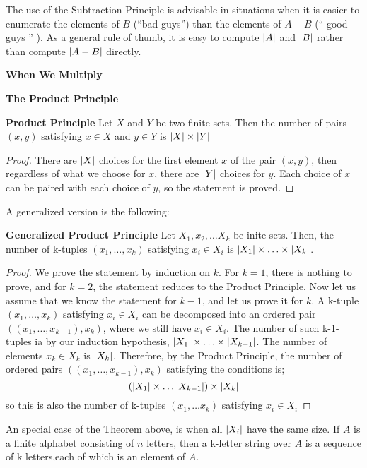 The use of the Subtraction Principle is advisable in situations when it is easier to enumerate the elements of $B$ (``bad guys'') than the elements of $ A - B $ (`` good guys '' ). As a general rule of thumb, it is easy to compute $\left| A \right|$ and $\left| B \right|$ rather than compute $ \left| A - B \right| $ directly.

\textbf{When We Multiply}

\textbf{The Product Principle}

\begin{thm}
	\textbf{Product Principle} Let $X$ and $Y$ be two finite sets. Then the number of pairs $(x,y)$ satisfying $x \in X $ and $y \in Y$ is $\left| X \right| \times \left| Y \right|$
\end{thm}
\begin{proof}
	There are $\left| X \right| $ choices for the first element $x$ of the pair $(x,y)$, then regardless of what we choose for $x$, there are $\left| Y \right|$ choices for $y$. Each choice of $x$ can be paired with each choice of $y$, so the statement is proved.
\end{proof}

A generalized version is the following:

\begin{thm}
	\textbf{Generalized Product Principle} Let $X_1,x_2, \ldots X_k$ be inite sets. Then, the number of k-tuples $(x_1,\ldots,x_k) $ satisfying $x_i \in X_i$ is $ \left| X_1 \right| \times \ldots \times \left| X_k \right| $.
\end{thm}

\begin{proof}
	We prove the statement by induction on $k$. For $k = 1$, there is nothing to prove, and for $ k = 2$, the statement reduces to the Product Principle. Now let us assume that we know the statement for $ k-1$, and let us prove it for $k$. A k-tuple $ (x_1, \ldots, x_k) $ satisfying $x_i \in X_i$ can be decomposed into an ordered pair $ ((x_1, \ldots, x_{k-1}), x_k) $, where we still have $x_i \in X_i$. The number of such k-1-tuples ia by our induction hypothesis, $ \left| X_1 \right| \times \ldots \times \left| X_{k-1} \right| $. The number of elements $x_k \in X_k$ is $ \left| X_k \right| $. Therefore, by the Product Principle, the number of ordered pairs $ ((x_1, \ldots, x_{k-1}), x_k) $ satisfying the conditions is;
	\[ (\left| X_1 \right| \times \ldots \left| X_{k-1} \right|) \times \left| X_k \right| \]
	so this is also the number of k-tuples $ (x_1, \ldots x_k) $ satisfying $ x_i \in X_i $
\end{proof}

An special case of the Theorem above, is when all $ \left| X_i \right| $ have the same size. If $A$ is a finite alphabet consisting of $n$ letters, then a k-letter string over $A$ is a sequence of k letters,each of which is an element of $A$.

